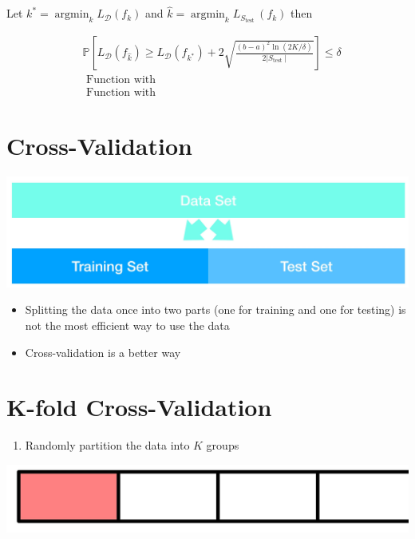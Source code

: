 \documentclass[10pt]{article}
\begin{document}
Let $k^{*}=\operatorname{argmin}_{k} L_{\mathscr{D}}\left(f_{k}\right)$ and $\hat{k}=\operatorname{argmin}_{k} L_{S_{\text {test }}}\left(f_{k}\right)$ then

$$
\begin{aligned}
& \mathbb{P}\left[L_{\mathscr{D}}\left(f_{\hat{k}}\right) \geq L_{\mathscr{D}}\left(f_{k^{*}}\right)+2 \sqrt{\frac{(b-a)^{2} \ln (2 K / \delta)}{2\left|S_{\text {test }}\right|}}\right] \leq \delta \\
& \text { Function with } \\
& \text { Function with }
\end{aligned}
$$

\section*{Cross-Validation}
\begin{center}
\includegraphics[max width=\textwidth]{2023_12_30_b4c98a1755bce7fa9493g-23}
\end{center}

\begin{itemize}
  \item Splitting the data once into two parts (one for training and one for testing) is not the most efficient way to use the data
  \item Cross-validation is a better way
\end{itemize}

\section*{K-fold Cross-Validation}
\begin{enumerate}
  \item Randomly partition the data into $K$ groups
\end{enumerate}

\begin{center}
\includegraphics[max width=\textwidth]{2023_12_30_b4c98a1755bce7fa9493g-24}
\end{center}
\end{document}

